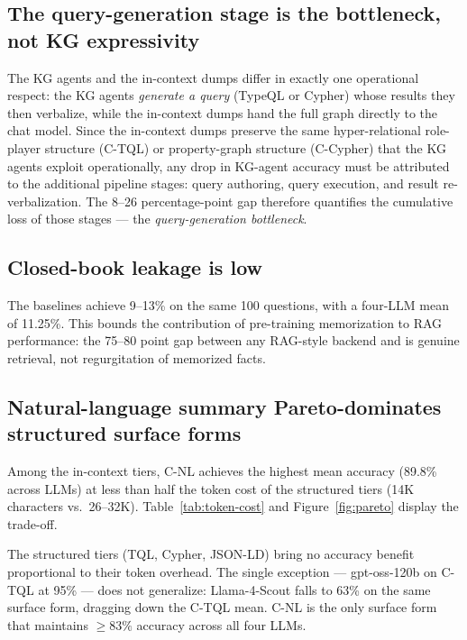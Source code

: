 \subsection{The query-generation stage is the bottleneck, not KG expressivity}

The KG agents and the in-context dumps differ in exactly one
operational respect: the KG agents \emph{generate a query} (TypeQL or
Cypher) whose results they then verbalize, while the in-context dumps
hand the full graph directly to the chat model. Since the in-context
dumps preserve the same hyper-relational role-player structure
(C-TQL) or property-graph structure (C-Cypher) that the KG agents
exploit operationally, any drop in KG-agent accuracy must be
attributed to the additional pipeline stages: query authoring, query
execution, and result re-verbalization. The 8--26 percentage-point
gap therefore quantifies the cumulative loss of those stages — the
\emph{query-generation bottleneck}.

\subsection{Closed-book leakage is low}

The  baselines achieve 9--13\% on the same
100 questions, with a four-LLM mean of 11.25\%. This bounds the
contribution of pre-training memorization to RAG performance: the
75--80 point gap between any RAG-style backend and
 is genuine retrieval, not regurgitation
of memorized facts.

\subsection{Natural-language summary Pareto-dominates structured surface forms}

Among the in-context tiers, C-NL achieves the highest mean accuracy
(89.8\% across LLMs) at less than half the token cost of the
structured tiers (14K characters vs.\ 26--32K).
Table~\ref{tab:token-cost} and Figure~\ref{fig:pareto} display the
trade-off.




The structured tiers (TQL, Cypher, JSON-LD) bring no accuracy benefit
proportional to their token overhead. The single exception —
gpt-oss-120b on C-TQL at 95\% — does not generalize: Llama-4-Scout
falls to 63\% on the same surface form, dragging down the C-TQL
mean. C-NL is the only surface form that maintains $\geq 83\%$
accuracy across all four LLMs.


